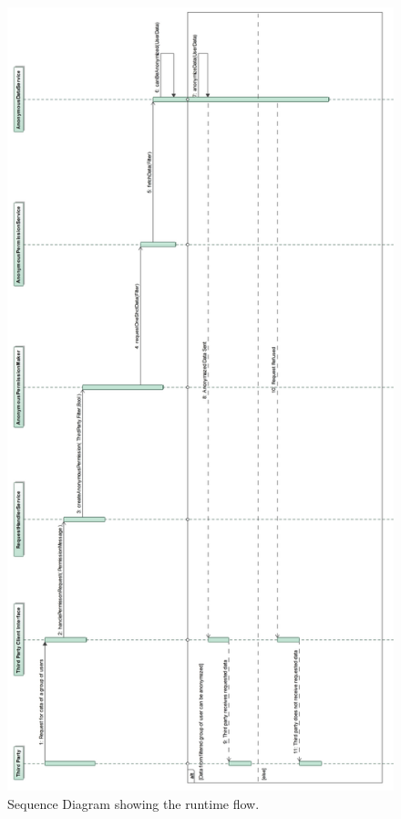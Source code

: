 \documentclass[a4paper]{article}
\begin{document}
\begin{figure}[H]
    \centering
    \includegraphics[width=\linewidth, height=\textheight]{SequenceDiagram-RequestForAnonymizedData}
    \caption{Sequence Diagram showing the runtime flow.}
    \label{fig:my_label}
\end{figure}
\clearpage
\end{document}
